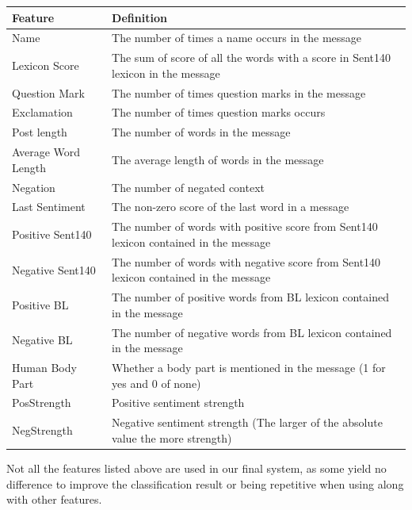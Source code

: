 \documentclass{llncs}
\begin{document}
\begin{center}
\begin{tabular}{  m{9em} | m{8cm}  } 
 \hline
 Feature & Definition \\ [0.5ex] 
 \hline\hline
 Name & The number of times a name occurs in the message\\[0.3em]
 Lexicon Score & The sum of score of all the words with a score in Sent140 lexicon in the message\\[0.3em]
 Question Mark & The number of times question marks in the message\\[0.3em]
 Exclamation & The number of times question marks occurs\\[0.3em]
 Post length & The number of words in the message\\[0.3em]
 Average Word Length & The average length of words in the message\\[0.3em]
 Negation & The number of negated context\\[0.3em]
 Last Sentiment & The non-zero score of the last word in a message\\[0.3em]
 Positive Sent140 & The number of words with positive score from Sent140 lexicon contained in the message\\[0.3em]
 Negative Sent140 & The number of words with negative score from Sent140 lexicon contained in the message\\[0.3em]
 Positive BL & The number of positive words from BL lexicon contained in the message\\[0.3em]
 Negative BL & The number of negative words from BL lexicon contained in the message\\[0.3em]
 Human Body Part & Whether a body part is mentioned in the message (1 for yes and 0 of none)\\[0.3em]
 PosStrength & Positive sentiment strength\\[0.3em]
 NegStrength & Negative sentiment strength (The larger of the absolute value the more strength)\\[0.3em]
 \hline
\end{tabular}
\end{center}
Not all the features listed above are used in our final system, as some yield no difference to improve the classification result or being repetitive when using along with other features. 
\end{document}
